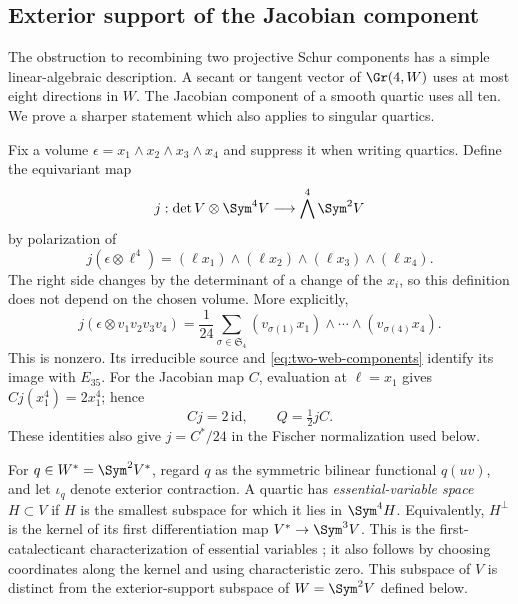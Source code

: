 \subsection{Exterior support of the Jacobian component}
\label{sec:schur-support}

The obstruction to recombining two projective Schur components has a
simple linear-algebraic description.  A secant or tangent vector of
\(\Gr(4,W)\) uses at most eight directions in \(W\).  The
Jacobian component of a smooth quartic uses all ten.  We prove a
sharper statement which also applies to singular quartics.

Fix a volume \(\epsilon=x_1\wedge x_2\wedge x_3\wedge x_4\)
and suppress it when writing quartics.  Define the equivariant map
\[
 j:\det V\otimes\Sym^4V\longrightarrow\bigwedge^4\Sym^2V
\]
by polarization of
\begin{equation}\label{eq:polarized-schur-embedding}
 j(\epsilon\otimes\ell^4)
       =(\ell x_1)\wedge(\ell x_2)\wedge(\ell x_3)\wedge(\ell x_4).
\end{equation}
The right side changes by the determinant of a change of the
\(x_i\), so this definition does not depend on the chosen volume.
More explicitly,
\begin{equation}\label{eq:schur-polarization-formula}
 j(\epsilon\otimes v_1v_2v_3v_4)
 =\frac1{24}\sum_{\sigma\in\mathfrak S_4}
       (v_{\sigma(1)}x_1)\wedge\cdots\wedge(v_{\sigma(4)}x_4).
\end{equation}
This is nonzero.  Its irreducible source and
\eqref{eq:two-web-components} identify its image with \(E_{35}\).
For the Jacobian map \(C\), evaluation at \(\ell=x_1\) gives
\(Cj(x_1^4)=2x_1^4\); hence
\begin{equation}\label{eq:jacobian-schur-normalization}
 Cj=2\,\mathrm{id},\qquad Q=\tfrac12jC.
\end{equation}
These identities also give \(j=C^*/24\) in the Fischer
normalization used below.

For \(q\in W^*=\Sym^2V^*\), regard \(q\) as the symmetric
bilinear functional \(q(uv)\), and let \(\iota_q\) denote
exterior contraction.  A quartic has \emph{essential-variable
space} \(H\subset V\) if \(H\) is the smallest subspace for
which it lies in \(\Sym^4H\).  Equivalently,
\(H^\perp\) is the kernel of its first differentiation map
\(V^*\to\Sym^3V\).  This is the first-catalecticant characterization of essential variables
\cite[Proposition~1]{Carlini}; it also follows by choosing
coordinates along the kernel and using characteristic zero.
This subspace of \(V\) is distinct from the exterior-support
subspace of \(W=\Sym^2V\) defined below.

